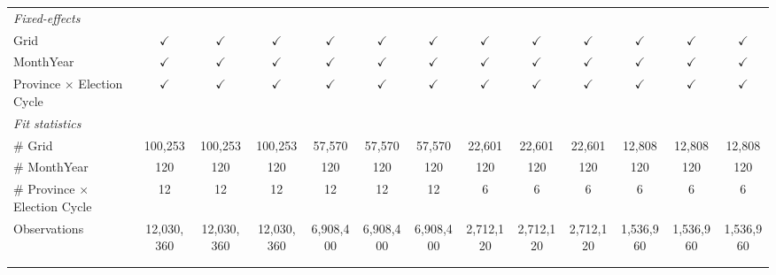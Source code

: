 \begin{table}[htbp]
\begin{tabular}{lcccccccccccc}
      \midrule
      \emph{Fixed-effects}\\
      Grid                                  & $\checkmark$  & $\checkmark$  & $\checkmark$  & $\checkmark$  & $\checkmark$  & $\checkmark$  & $\checkmark$  & $\checkmark$  & $\checkmark$  & $\checkmark$  & $\checkmark$  & $\checkmark$\\   
      MonthYear                             & $\checkmark$  & $\checkmark$  & $\checkmark$  & $\checkmark$  & $\checkmark$  & $\checkmark$  & $\checkmark$  & $\checkmark$  & $\checkmark$  & $\checkmark$  & $\checkmark$  & $\checkmark$\\   
      Province $\times$ Election Cycle      & $\checkmark$  & $\checkmark$  & $\checkmark$  & $\checkmark$  & $\checkmark$  & $\checkmark$  & $\checkmark$  & $\checkmark$  & $\checkmark$  & $\checkmark$  & $\checkmark$  & $\checkmark$\\   
      \midrule
      \emph{Fit statistics}\\
      \# Grid                               & 100,253       & 100,253       & 100,253       & 57,570        & 57,570        & 57,570        & 22,601        & 22,601        & 22,601        & 12,808        & 12,808        & 12,808\\  
      \# MonthYear                          & 120           & 120           & 120           & 120           & 120           & 120           & 120           & 120           & 120           & 120           & 120           & 120\\  
      \# Province $\times$ Election Cycle   & 12            & 12            & 12            & 12            & 12            & 12            & 6             & 6             & 6             & 6             & 6             & 6\\  
      Observations                          & 12,030,360    & 12,030,360    & 12,030,360    & 6,908,400     & 6,908,400     & 6,908,400     & 2,712,120     & 2,712,120     & 2,712,120     & 1,536,960     & 1,536,960     & 1,536,960\\  
      \midrule \midrule
                                            &               &               &               &               &               &               &               &               &               &               &               &  \tabularnewline 
      \\
   \end{tabular}
\end{table}


